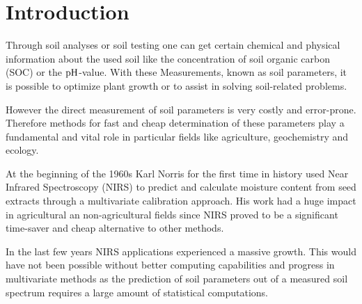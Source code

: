 \section{Introduction}
\label{sec:introduction}
	
	Through soil analyses or soil testing one can get certain chemical and physical information about the used soil like the concentration of soil organic carbon (SOC) or the $\mathrm{pH}$-value.
	With these Measurements, known as soil parameters, it is possible to optimize plant growth or to assist in solving soil-related problems.
	
	However the direct measurement of soil parameters is very costly and error-prone.
	Therefore methods for fast and cheap determination of these parameters play a fundamental and vital role in particular fields like agriculture, geochemistry and ecology.

	At the beginning of the 1960s Karl Norris for the first time in history used Near Infrared Spectroscopy (NIRS) to predict and calculate moisture content from seed extracts through a multivariate calibration approach.
	His work had a huge impact in agricultural an non-agricultural fields since NIRS proved to be a significant time-saver and cheap alternative to other methods.

	In the last few years NIRS applications experienced a massive growth.
	This would have not been possible without better computing capabilities and progress in multivariate methods as the prediction of soil parameters out of a measured soil spectrum requires a large amount of statistical computations.

